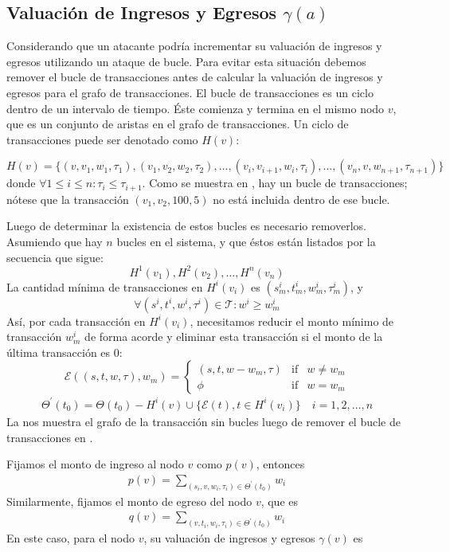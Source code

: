 \subsection{Valuación de Ingresos y Egresos $\gamma(a)$}
Considerando que un atacante podría incrementar su valuación de ingresos y egresos utilizando un ataque de bucle. Para evitar esta situación debemos remover el bucle de transacciones antes de calcular la valuación de ingresos y egresos para el grafo de transacciones. El bucle de transacciones es un ciclo dentro de un intervalo de tiempo.
Éste comienza y termina en el mismo nodo $v$, que es un conjunto de aristas en el grafo de transacciones. Un ciclo de transacciones puede ser denotado como $H(v)$:

\[
H(v) = \{(v, v_1, w_1, \tau_1), (v_1, v_2, w_2, \tau_2), \dots, (v_i, v_{i+1}, w_{i}, \tau_i), \dots, (v_n, v, w_{n+1}, \tau_{n+1})\}
\]
\noindent donde $\forall 1\le i \le n : \tau_i \le \tau_{i+1} $.
\noindent Como se muestra en , hay un bucle de transacciones; nótese que la transacción $(v_1, v_2, 100, 5)$ no está incluida dentro de ese bucle.




Luego de determinar la existencia de estos bucles es necesario removerlos. Asumiendo que hay $n$ bucles en el sistema, y que éstos están listados por la secuencia que sigue:
\[
H^1(v_1), H^2(v_2), \dots, H^n(v_n)\]
\noindent La cantidad mínima de transacciones en $H^i(v_i)$ es $(s^i_m, t^i_m, w^i_m, \tau^i_m)$, y
\[
\forall (s^i, t^i, w^i, \tau^i) \in \mathcal{T} : w^i \ge w^i_m
\]
\noindent Así, por cada transacción en $H^i(v_i)$, necesitamos reducir el monto mínimo de transacción $w^i_m$ de forma acorde y eliminar esta transacción si el monto de la última transacción es 0:
\[
\mathcal{E}((s, t, w, \tau), w_m) = \left\{ \begin{array}{rcl}
(s, t, w-w_m, \tau) & \mbox{if} & w \ne w_m \\
\phi & \mbox{if} & w = w_m
\end{array}\right.
\]
\begin{align}
\Theta^{\prime}(t_0)=\Theta(t_0)-H^i(v) \cup \{\mathcal{E}(t), t\in H^i(v_i)\} \quad i = 1, 2,\dots, n
\end{align}
\noindent La  nos muestra el grafo de la transacción sin bucles luego de remover el bucle de transacciones en .


Fijamos el monto de ingreso al nodo $v$ como $p(v)$, entonces
\begin{align}
\label{eq:dgr_func}
p(v) = \sum_{(s_i, v, w_i, \tau_i) \in \Theta^{\prime}(t_0)}{w_i}
\end{align}
\noindent Similarmente, fijamos el monto de egreso del nodo $v$, que es
\begin{align}
q(v) = \sum_{(v, t_i, w_i, \tau_i) \in \Theta^{\prime}(t_0)}{w_i}
\end{align}
\noindent En este caso,
para el nodo $v$, su valuación de ingresos y egresos $\gamma(v)$ es

